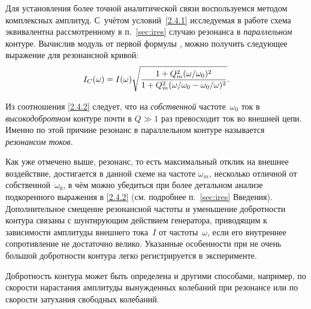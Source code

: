 Для установления более точной аналитической связи воспользуемся 
методом комплексных амплитуд. С~учётом условий~\eqref{2.4.1} 
исследуемая в работе схема эквивалентна рассмотренному в п.~\ref{sec:ires} 
случаю резонанса в \emph{параллельном} контуре. 
Вычислив модуль от первой формулы , можно получить 
следующее выражение
для резонансной кривой:
\begin{equation}
\eqmark{2.4.2}
I_C(\omega) = 
I(\omega) 
\sqrt{\frac{1+Q_m^2 (\omega/\omega_0)^2}{1+Q_m^2(\omega/\omega_0-\omega_0/\omega)^2}}.
\end{equation}

Из соотношения \eqref{2.4.2} следует, 
что на \emph{собственной} частоте~$\omega_0$ ток в \emph{высокодобротном} 
контуре почти в $Q\gg 1$ раз превосходит ток во внешней цепи. 
Именно по этой причине резонанс в параллельном контуре называется 
\emph{резонансом токов}. 


Как уже отмечено выше, резонанс, то есть максимальный отклик на внешнее воздействие, 
достигается в данной схеме на частоте $\omega_m$, несколько отличной от 
собственной~$\omega_0$, в чём можно убедиться при более детальном анализе 
подкоренного выражения в \eqref{2.4.2} (см. подробнее п.~\ref{sec:ires} Введения). 
Дополнительное смещение резонансной частоты и уменьшение добротности 
контура связаны с шунтирующим действием генератора, приводящим 
к зависимости амплитуды внешнего тока~$I$ от частоты~$\omega$, 
если его внутреннее сопротивление не достаточно велико.
Указанные особенности при не очень большой добротности контура легко регистрируется 
в эксперименте.


Добротность контура может быть определена и другими способами, например, 
по скорости нарастания амплитуды вынужденных колебаний при резонансе 
или по скорости затухания свободных колебаний. 

